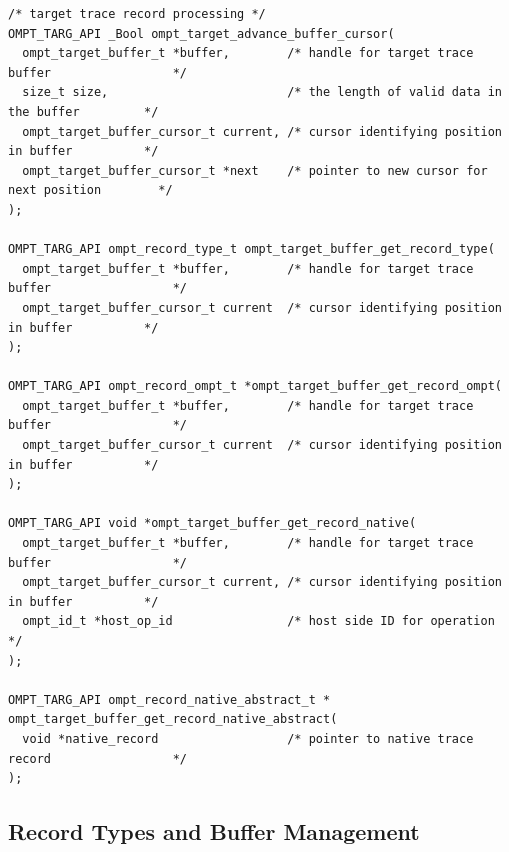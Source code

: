 \documentclass{article}
\begin{document}
\begin{verbatim}
/* target trace record processing */
OMPT_TARG_API _Bool ompt_target_advance_buffer_cursor(
  ompt_target_buffer_t *buffer,        /* handle for target trace buffer                 */
  size_t size,                         /* the length of valid data in the buffer         */
  ompt_target_buffer_cursor_t current, /* cursor identifying position in buffer          */
  ompt_target_buffer_cursor_t *next    /* pointer to new cursor for next position        */
);

OMPT_TARG_API ompt_record_type_t ompt_target_buffer_get_record_type(
  ompt_target_buffer_t *buffer,        /* handle for target trace buffer                 */
  ompt_target_buffer_cursor_t current  /* cursor identifying position in buffer          */
);

OMPT_TARG_API ompt_record_ompt_t *ompt_target_buffer_get_record_ompt(
  ompt_target_buffer_t *buffer,        /* handle for target trace buffer                 */
  ompt_target_buffer_cursor_t current  /* cursor identifying position in buffer          */
);
   
OMPT_TARG_API void *ompt_target_buffer_get_record_native(
  ompt_target_buffer_t *buffer,        /* handle for target trace buffer                 */
  ompt_target_buffer_cursor_t current, /* cursor identifying position in buffer          */
  ompt_id_t *host_op_id                /* host side ID for operation                     */
);
  
OMPT_TARG_API ompt_record_native_abstract_t *
ompt_target_buffer_get_record_native_abstract(
  void *native_record                  /* pointer to native trace record                 */
);
\end{verbatim}

\clearpage  
\subsection{Record Types and Buffer Management}
\label{appendix:ompt-records}
\end{document}
